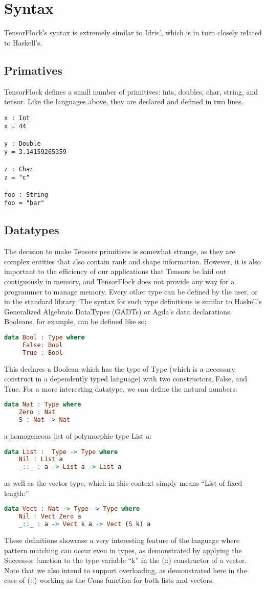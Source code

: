 \documentclass[12pt]{article}
\begin{document}
\section{Syntax}
TensorFlock's syntax is extremely similar to Idris', which is in turn closely related to Haskell's.

\subsection{Primatives}
TensorFlock defines a small number of primitives: ints, doubles, char, string, and tensor. Like the languages above, they are declared and defined in two lines.
\begin{lstlisting}
x : Int
x = 44

y : Double
y = 3.14159265359

z : Char
z = "c"

foo : String
foo = "bar"
\end{lstlisting}
\subsection{Datatypes}
The decision to make Tensors primitives is somewhat strange, as they are complex entities that also contain rank and shape information. However, it is also important to the efficiency of our applications that Tensors be laid out contiguously in memory, and TensorFlock does not provide any way for a programmer to manage memory. 
Every other type can be defined by the user, or in the standard library. The syntax for such type definitions is similar to Haskell's Generalized Algebraic DataTypes (GADTs) or Agda's data declarations. Booleans, for example, can be defined like so:
\begin{lstlisting}[language=Haskell]
data Bool : Type where
     False: Bool
     True : Bool
\end{lstlisting}
This declares a Boolean which has the type of Type (which is a necessary construct in a dependently typed language) with two constructors, False, and True. For a more interesting datatype, we can define the natural numbers:
\begin{lstlisting}[language=Haskell]
data Nat : Type where
    Zero : Nat
    S : Nat -> Nat
\end{lstlisting}
\pagebreak
 a homogeneous list of polymorphic type List a:
\begin{lstlisting}[language=Haskell]
data List :  Type -> Type where
    Nil : List a    
    _::_ : a -> List a -> List a
\end{lstlisting}
as well as the vector type, which in this context simply means ``List of fixed length:''
\begin{lstlisting}[language=Haskell]
data Vect : Nat -> Type -> Type where
    Nil : Vect Zero a
    _::_ : a -> Vect k a -> Vect (S k) a
\end{lstlisting}
These definitions showcase a very interesting feature of the language where pattern matching can occur even in types, as demonstrated by applying the Successor function to the type variable ``k'' in the (::) constructor of a vector. Note that we also intend to support overloading, as demonstrated here in the case of (::) working as the Cons function for both lists and vectors.
\end{document}
